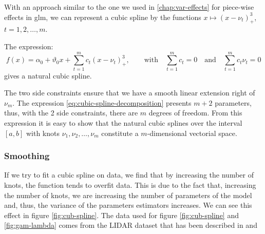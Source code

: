 \documentclass[a4paper, twoside, openright, 12pt]{report}
\let\origfigure\figure
\let\endorigfigure\endfigure
\renewenvironment{figure}[1][2] {
  \expandafter\origfigure\expandafter[!hbtp]
} {
  \endorigfigure
}
\theoremstyle{definition}
\theoremstyle{definition}
\theoremstyle{definition}
\theoremstyle{remark}
\begin{document}
With an approach similar to the one we used in \ref{chap:var-effects} for piece-wise effects in \ac{glm}, we can represent a cubic spline by the functions \(x \mapsto \left( x-\nu_t \right)_+^3\), \(t=1,2,\dots,m\).

The expression:
\begin{equation}
\label{eq:cubic-spline-decomposition}
f(x) = \alpha_0 + \vartheta_0 x + \sum_{t=1}^{m}{c_t \left( x-\nu_t \right)_+^3}, \qquad \text{with} \quad \sum_{t=1}^{m}{c_t} = 0 \quad \text{and} \quad \sum_{t=1}^{m}{c_t\nu_t} = 0
\end{equation}
gives a natural cubic spline.

The two side constraints ensure that we have a smooth linear extension right of \(\nu_m\). The expression \eqref{eq:cubic-spline-decomposition} presents \(m+2\) parameters, thus, with the 2 side constraints, there are \(m\) degrees of freedom. From this expression it is easy to show that the natural cubic splines over the interval \([a,b]\) with knots \(\nu_1, \nu_2, \dots, \nu_m\) constitute a \(m\)-dimensional vectorial space.

\hypertarget{smoothing}{%
\subsubsection{Smoothing}\label{smoothing}}

If we try to fit a cubic spline on data, we find that by increasing the number of knots, the function tends to overfit data. This is due to the fact that, increasing the number of knots, we are increasing the number of parameters of the model and, thus, the variance of the parameters estimators increases. We can see this effect in figure \ref{fig:cub-spline}. The data used for figure \ref{fig:cub-spline} and \ref{fig:gam-lambda} comes from the LIDAR dataset that has been described in \autocite{ruppert2003semiparametric} and \autocite{holst1996locally}







\begin{figure}[!hbtp]

{\centering {}\newline{}

}

\caption[\ac{glm} with cubic splines for different numbers of knots.]{\ac{glm} with cubic splines for different numbers of knots. The more knots there are, the wigglier the estimated function \(\hat{f}(x)\) is.}\label{fig:cub-spline}
\end{figure}
\end{document}

